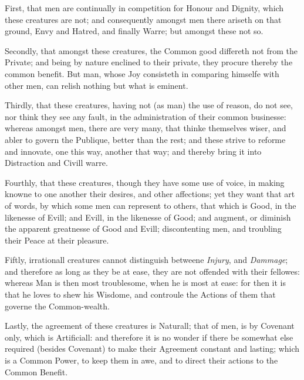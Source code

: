 First, that men are continually in competition for Honour and Dignity,
which these creatures are not; and consequently amongst men there
ariseth on that ground, Envy and Hatred, and finally Warre; but
amongst these not so.

Secondly, that amongst these creatures, the Common good differeth not
from the Private; and being by nature enclined to their private, they
procure thereby the common benefit. But man, whose Joy consisteth in
comparing himselfe with other men, can relish nothing but what is
eminent.

Thirdly, that these creatures, having not (as man) the use of reason,
do not see, nor think they see any fault, in the administration of
their common businesse: whereas amongst men, there are very many, that
thinke themselves wiser, and abler to govern the Publique, better than
the rest; and these strive to reforme and innovate, one this way,
another that way; and thereby bring it into Distraction and Civill
warre.

Fourthly, that these creatures, though they have some use of
voice, in making knowne to one another their desires, and other
affections; yet they want that art of words, by which some men can
represent to others, that which is Good, in the likenesse of Evill;
and Evill, in the likenesse of Good; and augment, or diminish the
apparent greatnesse of Good and Evill; discontenting men, and
troubling their Peace at their pleasure.

Fiftly, irrationall creatures cannot distinguish betweene
\textit{Injury}, and \textit{Damm\-age}; and therefore as long as they
be at ease, they are not offended with their fellowes: whereas Man is
then most troublesome, when he is most at ease: for then it is that he
loves to shew his Wisdome, and controule the Actions of them that
governe the Common-wealth.

Lastly, the agreement of these creatures is Naturall; that of men, is
by Covenant only, which is Artificiall: and therefore it is no wonder
if there be somewhat else required (besides Covenant) to make their
Agreement constant and lasting; which is a Common Power, to keep them
in awe, and to direct their actions to the Common Benefit.

